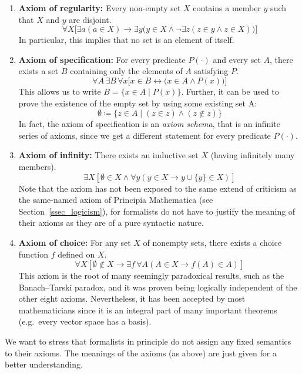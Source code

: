 \documentclass{article}
\begin{document}
\begin{enumerate}
    \item \textbf{Axiom of regularity:} Every non-empty set $X$ contains a member $y$ such that $X$ and $y$ are disjoint.
\begin{equation*}
\forall X \bigl[\exists a ( a \in X) \rightarrow \exists y \bigl( y \in X \land \lnot \exists z (z \in y \land z \in X)\bigr)\bigr]
\end{equation*}
In particular, this implies that no set is an element of itself.
    \item \textbf{Axiom of specification:} For every predicate $P(\cdot)$ and every set $A$, there exists a set $B$ containing only the elements of $A$ satisfying $P$.
\begin{equation*}
\forall A\,\exists B\,\forall x\bigl[x\in B \leftrightarrow \bigl(x\in A \land P(x)\bigr)\bigr]
\end{equation*}
This allows us to write $B=\{x\in A\mid P(x)\}$. Further, it can be used to prove the existence of the empty set by using some existing set A:
\begin{equation*}
\emptyset\coloneqq\{z\in A\mid (z\in z)\land(z\notin z)\}
\end{equation*}
In fact, the axiom of specification is an \textit{axiom schema}, that is an infinite series of axioms, since we get a different statement for every predicate $P(\cdot)$.
    \item \textbf{Axiom of infinity:} There exists an inductive set $X$ (having infinitely many members).
\begin{equation*}
\exists X \left [\emptyset \in X \land \forall y (y \in X \rightarrow y\cup\{y\}  \in X)\right]
\end{equation*}
Note that the axiom has not been exposed to the same extend of criticism as the same-named axiom of Principia Mathematica (see Section~\ref{ssec_logicism}), for formalists do not have to justify the meaning of their axioms as they are of a pure syntactic nature.
    \item \textbf{Axiom of choice:} For any set $X$ of nonempty sets, there exists a choice function $f$ defined on $X$. 
\begin{equation*}
\forall X \left[ \emptyset \notin X \rightarrow \exists f\,\forall A(A\in X\rightarrow f(A) \in A ) \right]
\end{equation*}
This axiom is the root of many seemingly paradoxical results, such as the Banach–Tarski paradox, and it was proven being logically independent of the other eight axioms. Nevertheless, it has been accepted by most mathematicians since it is an integral part of many important theorems (e.g.\ every vector space has a basis).
\end{enumerate}
\normalsize
We want to stress that formalists in principle do not assign any fixed semantics to their axioms. The meanings of the axioms (as above) are just given for a better understanding.
\end{document}
